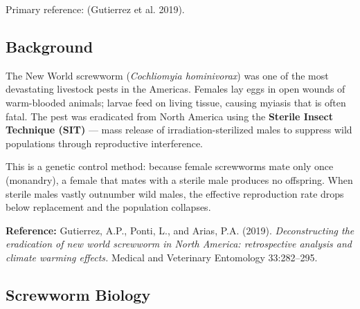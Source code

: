 Primary reference: (Gutierrez et al. 2019).



\subsection{Background}



\label{13776314717791382304}{}


The New World screwworm (\emph{Cochliomyia hominivorax}) was one of the most devastating livestock pests in the Americas. Females lay eggs in open wounds of warm-blooded animals; larvae feed on living tissue, causing myiasis that is often fatal. The pest was eradicated from North America using the \textbf{Sterile Insect Technique (SIT)} — mass release of irradiation-sterilized males to suppress wild populations through reproductive interference.



This is a genetic control method: because female screwworms mate only once (monandry), a female that mates with a sterile male produces no offspring. When sterile males vastly outnumber wild males, the effective reproduction rate drops below replacement and the population collapses.



\textbf{Reference:} Gutierrez, A.P., Ponti, L., and Arias, P.A. (2019). \emph{Deconstructing the eradication of new world screwworm in North America: retrospective analysis and climate warming effects.} Medical and Veterinary Entomology 33:282–295.



\subsection{Screwworm Biology}



\label{13591122868803579140}{}



